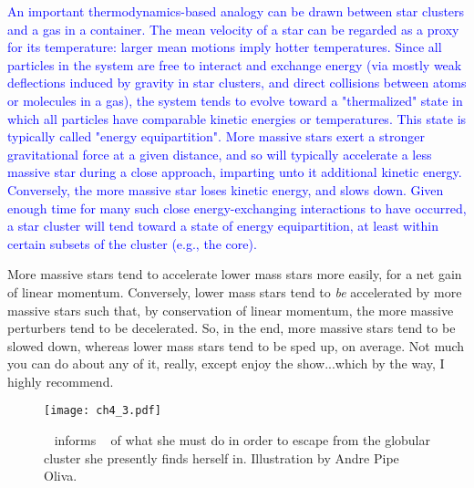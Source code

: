 \documentclass[main.tex]{subfiles}
\begin{document}
\begin{tcolorbox}[sharp corners, colback=blue!30, colframe=blue!80!blue, title=Energy Equipartition]
\par \textcolor{blue} {An important thermodynamics-based analogy can be drawn between star clusters and a gas in a container.  The mean velocity of a star can be regarded as a proxy for its temperature:  larger mean motions imply hotter temperatures.  Since all particles in the system are free to interact and exchange energy (via mostly weak deflections induced by gravity in star clusters, and direct collisions between atoms or molecules in a gas), the system tends to evolve toward a "thermalized" state in which all particles have comparable kinetic energies or temperatures.  This state is typically called "energy equipartition".  More massive stars exert a stronger gravitational force at a given distance, and so will typically accelerate a less massive star during a close approach, imparting unto it additional kinetic energy.  Conversely, the more massive star loses kinetic energy, and slows down.  Given enough time for many such close energy-exchanging interactions to have occurred, a star cluster will tend toward a state of energy equipartition, at least within certain subsets of the cluster (e.g., the core).}
\end{tcolorbox} 


\par \Enrico More massive stars tend to accelerate lower mass stars more easily, for a net gain of linear momentum.  Conversely, lower mass stars tend to \textit{be} accelerated by more massive stars such that, by conservation of linear momentum, the more massive perturbers tend to be decelerated. So, in the end, more massive stars tend to be slowed down, whereas lower mass stars tend to be sped up, on average.  Not much you can do about any of it, really, except enjoy the show...which by the way, I highly recommend.

\begin{figure}
\texttt{[image: ch4\_3.pdf]}
\caption{\rmenrico~ informs \rmsterope~ of what she must do in order to escape from the globular cluster she presently finds herself in.  Illustration by Andre Pipe Oliva.
\label{fig:fig1}}
\end{figure}
\end{document}
